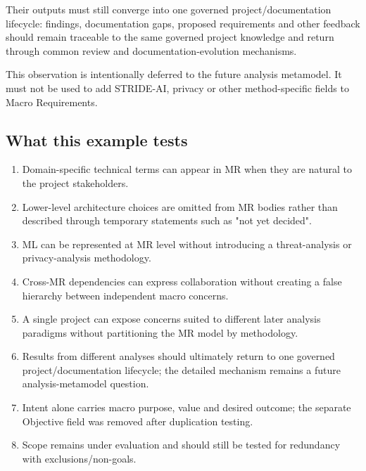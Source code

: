 \documentclass[
  10pt,
]{article}
\providecommand{\tightlist}{%
  \setlength{\itemsep}{0pt}\setlength{\parskip}{0pt}}
\begin{document}
Their outputs must still converge into one governed
project/documentation lifecycle: findings, documentation gaps, proposed
requirements and other feedback should remain traceable to the same
governed project knowledge and return through common review and
documentation-evolution mechanisms.

This observation is intentionally deferred to the future analysis
metamodel. It must not be used to add STRIDE-AI, privacy or other
method-specific fields to Macro Requirements.

\subsection{What this example tests}\label{what-this-example-tests}

\begin{enumerate}
\def\labelenumi{\arabic{enumi}.}
\tightlist
\item
  Domain-specific technical terms can appear in MR when they are natural
  to the project stakeholders.
\item
  Lower-level architecture choices are omitted from MR bodies rather
  than described through temporary statements such as "not yet decided".
\item
  ML can be represented at MR level without introducing a
  threat-analysis or privacy-analysis methodology.
\item
  Cross-MR dependencies can express collaboration without creating a
  false hierarchy between independent macro concerns.
\item
  A single project can expose concerns suited to different later
  analysis paradigms without partitioning the MR model by methodology.
\item
  Results from different analyses should ultimately return to one
  governed project/documentation lifecycle; the detailed mechanism
  remains a future analysis-metamodel question.
\item
  Intent alone carries macro purpose, value and desired outcome; the
  separate Objective field was removed after duplication testing.
\item
  Scope remains under evaluation and should still be tested for
  redundancy with exclusions/non-goals.
\end{enumerate}
\end{document}
